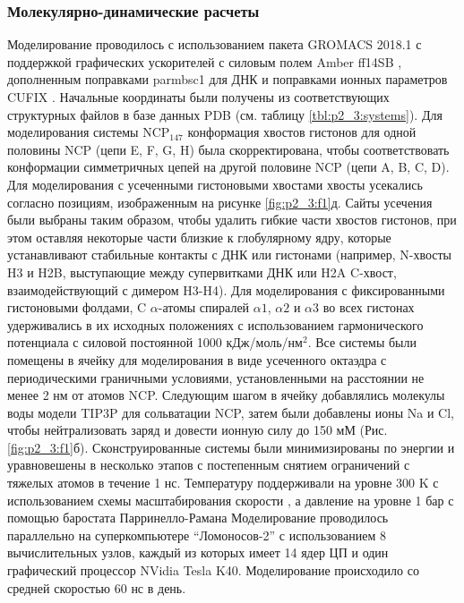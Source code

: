 \subsubsection{Молекулярно-динамические расчеты}
Моделирование проводилось с использованием пакета GROMACS 2018.1 с поддержкой графических ускорителей \cite{abraham_gromacs:_2015} с силовым полем Amber ff14SB \cite{maier_ff14sb_2015}, дополненным поправками parmbsc1 \cite{ivani_parmbsc1_2016} для ДНК и поправками ионных параметров CUFIX \cite{yoo_new_2018}. Начальные координаты были получены из соответствующих структурных файлов в базе данных PDB (см. таблицу \ref{tbl:p2_3:systems}). Для моделирования системы NCP$_{147}$ конформация хвостов гистонов для одной половины NCP (цепи E, F, G, H) была скорректирована, чтобы соответствовать конформации симметричных цепей на другой половине NCP (цепи A, B, C, D). Для моделирования с усеченными гистоновыми хвостами хвосты усекались согласно позициям, изображенным на рисунке \ref{fig:p2_3:f1}д. Сайты усечения были выбраны таким образом, чтобы удалить гибкие части хвостов гистонов, при этом оставляя некоторые части близкие к глобулярному ядру, которые устанавливают стабильные контакты с ДНК или гистонами (например, N-хвосты H3 и H2B, выступающие между супервитками ДНК или H2A C-хвост, взаимодействующий с димером H3-H4). Для моделирования с фиксированными гистоновыми фолдами, C $\alpha$-атомы спиралей $\alpha1$, $\alpha2$ и $\alpha3$ во всех гистонах удерживались в их исходных положениях с использованием гармонического потенциала с силовой постоянной 1000 кДж/моль/нм$^2$. Все системы были помещены в ячейку для моделирования в виде усеченного октаэдра с периодическими граничными условиями, установленными на расстоянии не менее 2 нм от атомов NCP. Следующим шагом в ячейку добавлялись молекулы воды модели TIP3P \cite{jorgensen_comparison_1983} для сольватации NCP, затем были добавлены ионы Na и Cl, чтобы нейтрализовать заряд и довести ионную силу до 150 мМ (Рис. \ref{fig:p2_3:f1}б). Сконструированные системы были минимизированы по энергии и уравновешены в несколько этапов с постепенным снятием ограничений с тяжелых атомов в течение 1 нс. Температуру поддерживали на уровне 300 K с использованием схемы масштабирования скорости \cite{bussi_canonical_2007}, а давление на уровне 1 бар с помощью баростата Парринелло-Рамана \cite{parrinello_polymorphic_1981} Моделирование проводилось параллельно на суперкомпьютере ``Ломоносов-2'' \cite{voevodin_supercomputer_2019} с использованием 8 вычислительных узлов, каждый из которых имеет 14 ядер ЦП и один графический процессор NVidia Tesla K40. Моделирование происходило со средней скоростью 60 нс в день.

